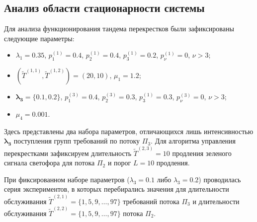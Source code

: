 \documentclass[a4paper,12pt,russian]{extarticle}
\begin{document}
\subsection{Анализ области стационарности системы}
Для анализа функционирования тандема перекрестков были зафиксированы следующие параметры:
\begin{itemize}
    \item $\lambda_1=0.35$, $p_{1}^{(1)}=0.4$, $p_{2}^{(1)}=0.4$, $p_{3}^{(1)}=0.2$, $p_{\nu}^{(1)}=0$, $\nu > 3$;
    \item $(\widetilde{T}^{(1,1)}, \widetilde{T}^{(1,2)})=(20,10)$, $\mu_1 = 1.2$;
    \item $\boldsymbol{ \lambda_3=\{0.1, 0.2\}}$, $p_{1}^{(3)}=0.4$, $p_{2}^{(3)}=0.3$, $p_{3}^{(1)}=0.3$, $p_{\nu}^{(3)}=0$, $\nu > 3$;
        \item $\mu_4= 0.001$.
\end{itemize}
Здесь представлены два набора параметров, отличающихся лишь интенсивностью $\boldsymbol{\lambda_3}$ поступления групп требований по потоку $\Pi_3$. Для алгоритма управления перекрестками зафиксируем длительность $\widetilde{T}^{(2,3)}=10$ продления зеленого сигнала светофора для потока $\Pi_2$ и порог $L=10$ продления.

При фиксированном наборе параметров ($\lambda_3 = 0.1$ либо $\lambda_3=0.2$) проводилась серия экспериментов, в которых перебирались значения для длительности обслуживания  $\widetilde{T}^{(2,1)} = \{1, 5, 9, \ldots, 97\}$ требований потока $\Pi_3$ и длительности обслуживания $\widetilde{T}^{(2,2)} = \{1, 5, 9, \ldots, 97\}$ потока $\Pi_2$.
\end{document}
